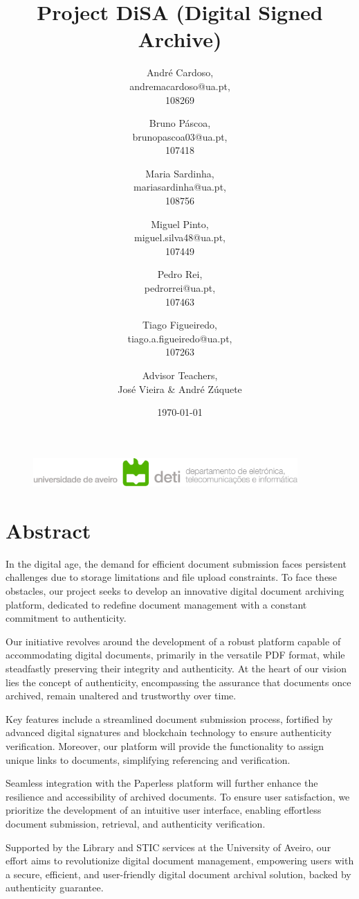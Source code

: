 \documentclass[a4paper,11pt]{article}
\title{\textbf{Project DiSA (Digital Signed Archive)}}
\author{
    André Cardoso,\\
    andremacardoso@ua.pt,\\
    108269\\
    \and
    Bruno Páscoa,\\
    brunopascoa03@ua.pt,\\
    107418\\
    \and
    Maria Sardinha,\\
    mariasardinha@ua.pt,\\
    108756\\
    \and
    Miguel Pinto,\\
    miguel.silva48@ua.pt,\\
    107449\\
    \and
    Pedro Rei,\\
    pedrorrei@ua.pt,\\
    107463\\
    \and  
    Tiago Figueiredo,\\
    tiago.a.figueiredo@ua.pt,\\
    107263\\
    \and
    Advisor Teachers,\\
    José Vieira \& André Zúquete\\
}
\date{\today}
\begin{document}
    \begin{figure}
        \centering
        \includegraphics[width=0.9\textwidth]{deti2}\label{fig:figure}
    \end{figure}
    \maketitle
    \clearpage %
    \section{Abstract}\label{sec:Abstract}
        In the digital age, the demand for efficient document submission faces persistent challenges due to storage limitations and file upload constraints. To face these obstacles, our project seeks to develop an innovative digital document archiving platform, dedicated to redefine document management with a constant commitment to authenticity.
        
        Our initiative revolves around the development of a robust platform capable of accommodating digital documents, primarily in the versatile PDF format, while steadfastly preserving their integrity and authenticity. At the heart of our vision lies the concept of authenticity, encompassing the assurance that documents once archived, remain unaltered and trustworthy over time. 
        
        Key features include a streamlined document submission process, fortified by advanced digital signatures and blockchain technology to ensure authenticity verification. Moreover, our platform will provide the functionality to assign unique links to documents, simplifying referencing and verification. 
        
        Seamless integration with the Paperless platform will further enhance the resilience and accessibility of archived documents. To ensure user satisfaction, we prioritize the development of an intuitive user interface, enabling effortless document submission, retrieval, and authenticity verification. 
        
        Supported by the Library and STIC services at the University of Aveiro, our effort aims to revolutionize digital document management, empowering users with a secure, efficient, and user-friendly digital document archival solution, backed by authenticity guarantee.
\end{document}
